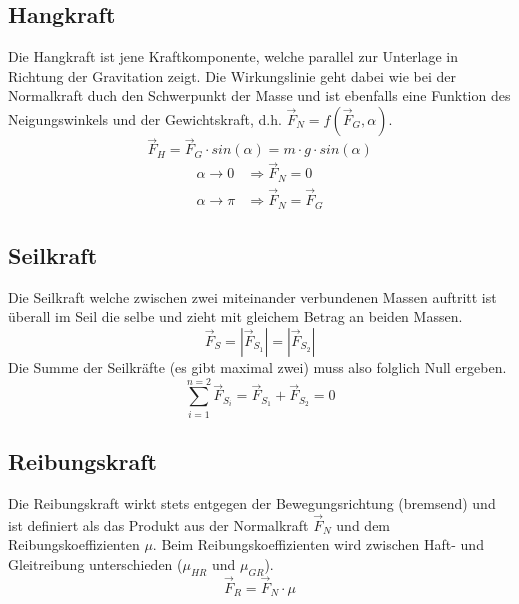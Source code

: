 \subsection{Hangkraft}
Die Hangkraft ist jene Kraftkomponente, welche parallel zur Unterlage in 
Richtung der Gravitation zeigt. Die Wirkungslinie geht dabei wie bei der 
Normalkraft duch den Schwerpunkt der Masse und ist ebenfalls eine Funktion
des Neigungswinkels und der Gewichtskraft, d.h. 
$\vec{F}_N = f(\vec{F}_G, \alpha)$.
\[ \boxed{ \vec{F}_H  = \vec{F}_G \cdot sin(\alpha) = m \cdot g \cdot sin(\alpha)} \]
\[ \begin{array}{ll}
	\alpha \rightarrow 0 & \Rightarrow \vec{F}_N = 0 \\
	\alpha \rightarrow \pi & \Rightarrow \vec{F}_N = \vec{F}_G
\end{array} \]

\subsection{Seilkraft}
Die Seilkraft welche zwischen zwei miteinander verbundenen Massen auftritt
ist überall im Seil die selbe und zieht mit gleichem Betrag an beiden Massen.
\[ \vec{F}_S = |\vec{F}_{S_1}| = |\vec{F}_{S_2}| \]
Die Summe der Seilkräfte (es gibt maximal zwei) muss also folglich Null ergeben.
\[ \sum_{i=1}^{n=2} \vec{F}_{S_i} = \vec{F}_{S_1} + \vec{F}_{S_2} = 0 \]

\subsection{Reibungskraft}
Die Reibungskraft wirkt stets entgegen der Bewegungsrichtung (bremsend) und ist
definiert als das Produkt aus der Normalkraft $\vec{F}_N$ und dem 
Reibungskoeffizienten $\mu$. Beim Reibungskoeffizienten wird  zwischen 
Haft- und Gleitreibung unterschieden ($\mu_{HR}$ und $\mu_{GR}$).
\[ \boxed{\vec{F}_R = \vec{F}_N \cdot \mu} \]

